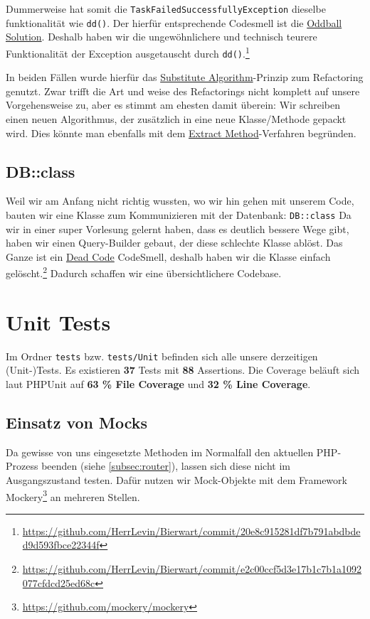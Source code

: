 \documentclass[12pt,a4paper,titlepage,ngerman,pdftex]{report}
\begin{document}
    Dummerweise hat somit die \verb|TaskFailedSuccessfullyException| dieselbe funktionalität wie \verb|dd()|.
    Der hierfür entsprechende Codesmell ist die \href{https://pragmaticways.com/31-code-smells-you-must-know/#6_Oddball_Solution}{Oddball Solution}.
    Deshalb haben wir die ungewöhnlichere und technisch teurere Funktionalität der Exception ausgetauscht durch \verb|dd()|.\footnote{\url{https://github.com/HerrLevin/Bierwart/commit/20e8c915281df7b791abdbded9d593fbce22344f}}

    In beiden Fällen wurde hierfür das \href{https://refactoring.guru/substitute-algorithm}{Substitute Algorithm}-Prinzip zum Refactoring genutzt.
    Zwar trifft die Art und weise des Refactorings nicht komplett auf unsere Vorgehensweise zu, aber es stimmt am ehesten damit überein:
    Wir schreiben einen neuen \glqq Algorithmus\grqq{}, der zusätzlich in eine neue Klasse/Methode gepackt wird.
    Dies könnte man ebenfalls mit dem \href{https://refactoring.guru/extract-method}{Extract Method}-Verfahren begründen.

    \subsection{DB::class}\label{subsec:db::class}
    Weil wir am Anfang nicht richtig wussten, wo wir hin gehen mit unserem Code, bauten wir eine Klasse zum Kommunizieren mit der Datenbank: \verb|DB::class|
    Da wir in einer super Vorlesung gelernt haben, dass es deutlich bessere Wege gibt, haben wir einen Query-Builder gebaut, der diese schlechte Klasse ablöst.
    Das Ganze ist ein \href{https://refactoring.guru/smells/dead-code}{Dead Code} CodeSmell, deshalb haben wir die Klasse einfach gelöscht.\footnote{\url{https://github.com/HerrLevin/Bierwart/commit/e2c00ccf5d3e17b1c7b1a1092077cfdcd25ed68c}}
    Dadurch schaffen wir eine übersichtlichere Codebase.

    \section{Unit Tests}
    Im Ordner \verb|tests| bzw. \verb|tests/Unit| befinden sich alle unsere derzeitigen (Unit-)Tests.
    Es existieren \textbf{37} Tests mit \textbf{88} Assertions.
    Die Coverage beläuft sich laut PHPUnit auf \textbf{63 \% File Coverage} und \textbf{32 \% Line Coverage}.

    \subsection{Einsatz von Mocks}
    Da gewisse von uns eingesetzte Methoden im Normalfall den aktuellen PHP-Prozess beenden (siehe \ref{subsec:router}), lassen sich diese nicht im Ausgangszustand testen.
    Dafür nutzen wir Mock-Objekte mit dem Framework Mockery\footnote{\url{https://github.com/mockery/mockery}} an mehreren Stellen.
\end{document}
